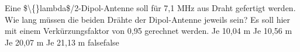     {Eine \$\textbackslash\{\}lambda\$/2-Dipol-Antenne soll für 7,1 MHz aus Draht gefertigt werden. Wie lang müssen die beiden Drähte der Dipol-Antenne jeweils sein? Es soll hier mit einem Verkürzungsfaktor von 0,95 gerechnet werden.}
    {Je 10,04 m}
    {Je 10,56 m}
    {Je 20,07 m}
    {Je 21,13 m}
    {false}{false}